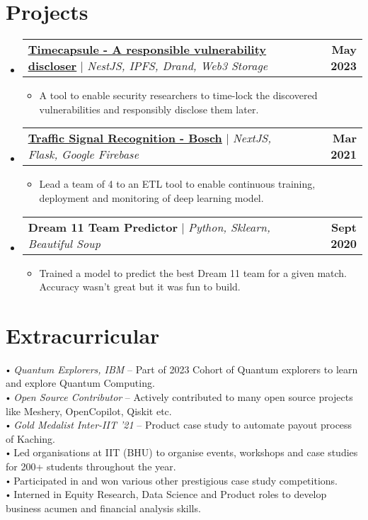 \documentclass[letterpaper,11pt]{article}
\makeatletter
\newcommand{\resumeItem}[1]{
  \item\small{
    {#1 \vspace{-1.5pt}}
  }
}
\newcommand{\resumeProjectHeading}[2]{
    \item
    \begin{tabular*}{1.001\textwidth}{l@{\extracolsep{\fill}}r}
      \small#1 & \textbf{\small #2}\\
    \end{tabular*}\vspace{-7pt}
}
\newcommand{\resumeSubHeadingListStart}{\begin{itemize}[leftmargin=0.0in, label={}]}
\newcommand{\resumeSubHeadingListEnd}{\end{itemize}}
\newcommand{\resumeItemListStart}{\begin{itemize}}
\newcommand{\resumeItemListEnd}{\end{itemize}\vspace{0pt}}
\makeatother
\begin{document}
\section{Projects}
    \vspace{-5pt}
    \resumeSubHeadingListStart
      \resumeProjectHeading
          {\href{https://github.com/yagarwal-allo/timecapsule}{\underline{\textbf{Timecapsule - A responsible vulnerability discloser}}} $|$ \emph{NestJS, IPFS, Drand, Web3 Storage}}{May 2023}
          \resumeItemListStart
            \resumeItem{A tool to enable security researchers to time-lock the discovered vulnerabilities and responsibly disclose them later.}
          \resumeItemListEnd 
          \vspace{-17pt}
      \resumeProjectHeading
          {\href{https://github.com/dhritimaandas/Traffic_Sign_Recog_Inter_IIT}{\underline{\textbf{Traffic Signal Recognition - Bosch}}} $|$ \emph{NextJS, Flask, Google Firebase}}{Mar 2021}
          \resumeItemListStart
            \resumeItem{Lead a team of 4 to an ETL tool to enable continuous training, deployment and monitoring of deep learning model.}
          \resumeItemListEnd
          \vspace{-17pt}
      \resumeProjectHeading
          {\textbf{Dream 11 Team Predictor} $|$ \emph{Python, Sklearn, Beautiful Soup}}{Sept 2020}
          \resumeItemListStart
            \resumeItem{Trained a model to predict the best Dream 11 team for a given match. Accuracy wasn't great but it was fun to build.}
          \resumeItemListEnd 
    \resumeSubHeadingListEnd
\vspace{-15pt}

%
\section{Extracurricular}
\begin{itemize}[leftmargin=0in, label={}]
   \small{\item{
    {$\vcenter{\hbox{\tiny$\bullet$}}$}  \emph{Quantum Explorers, IBM} -- Part of 2023 Cohort of Quantum explorers to learn and explore Quantum Computing. \\
    {$\vcenter{\hbox{\tiny$\bullet$}}$}  \emph{Open Source Contributor} -- Actively contributed to many open source projects like Meshery, OpenCopilot, Qiskit etc. \\
    {$\vcenter{\hbox{\tiny$\bullet$}}$}  \emph{Gold Medalist Inter-IIT '21} -- Product case study to automate payout process of Kaching.  \\
    {$\vcenter{\hbox{\tiny$\bullet$}}$}  Led organisations at IIT (BHU) to organise events, workshops and case studies for 200+ students throughout the year. \\
    {$\vcenter{\hbox{\tiny$\bullet$}}$}  Participated in and won various other prestigious case study competitions. \\
    {$\vcenter{\hbox{\tiny$\bullet$}}$}  Interned in Equity Research, Data Science and Product roles to develop business acumen and financial analysis skills.  \\
   }}
\end{itemize}
\vspace{-16pt}
\end{document}
